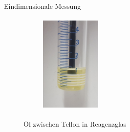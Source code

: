 \begin{frame}{Eindimensionale Messung}
	\begin{figure} %
	\centering
	\begin{subfigure}{.49\textwidth}
	\centering
	\includegraphics[width=3cm, height=5cm]{images//oilteflon.jpg}
	\end{subfigure}
	\begin{subfigure}{.49\textwidth}
	\centering
	\end{subfigure}
	\caption{Öl zwischen Teflon in Reagenzglas}
	\end{figure}
\end{frame}

